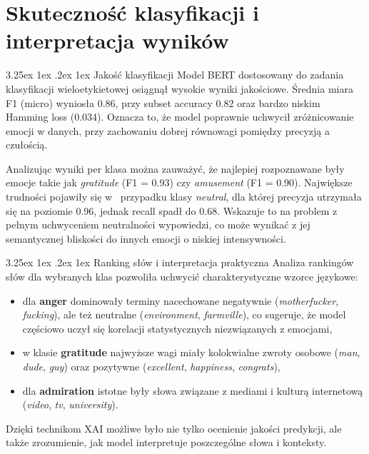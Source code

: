 \documentclass[wmii, inf, mgr]{uwmthesis}
\makeatletter
\renewcommand\paragraph{\@startsection{paragraph}{4}{\z@}%
  {3.25ex \@plus1ex \@minus.2ex}%
  {1ex}%
  {\normalfont\normalsize\bfseries}}
\makeatother
\begin{document}
\section{Skuteczność klasyfikacji i interpretacja wyników}
\paragraph{Jakość klasyfikacji}
Model BERT dostosowany do zadania klasyfikacji wieloetykietowej osiągnął wysokie wyniki jakościowe. Średnia miara F1 (micro) wyniosła 0.86, przy subset accuracy 0.82 oraz bardzo niskim Hamming loss (0.034). Oznacza to, że model poprawnie uchwycił zróżnicowanie emocji w danych, przy zachowaniu dobrej równowagi pomiędzy precyzją a czułością.  

Analizując wyniki per klasa można zauważyć, że najlepiej rozpoznawane były emocje takie jak \textit{gratitude} (F1 = 0.93) czy \textit{amusement} (F1 = 0.90). Największe trudności pojawiły się w~ przypadku klasy \textit{neutral}, dla której precyzja utrzymała się na poziomie 0.96, jednak recall spadł do 0.68. Wskazuje to na problem z pełnym uchwyceniem neutralności wypowiedzi, co może wynikać z jej semantycznej bliskości do innych emocji o niskiej intensywności.

\paragraph{Ranking słów i interpretacja praktyczna}
Analiza rankingów słów dla wybranych klas pozwoliła uchwycić charakterystyczne wzorce językowe:
\begin{itemize}
	\item dla \textbf{anger} dominowały terminy nacechowane negatywnie (\textit{motherfucker}, \textit{fucking}), ale też neutralne (\textit{environment}, \textit{farmville}), co sugeruje, że model częściowo uczył się korelacji statystycznych niezwiązanych z emocjami,
	\item w klasie \textbf{gratitude} najwyższe wagi miały kolokwialne zwroty osobowe (\textit{man}, \textit{dude}, \textit{guy}) oraz pozytywne (\textit{excellent}, \textit{happiness}, \textit{congrats}),
	\item dla \textbf{admiration} istotne były słowa związane z mediami i kulturą internetową (\textit{video}, \textit{tv}, \textit{university}).
\end{itemize}
Dzięki technikom XAI możliwe było nie tylko ocenienie jakości predykcji, ale także zrozumienie, jak model interpretuje poszczególne słowa i konteksty.
\end{document}
